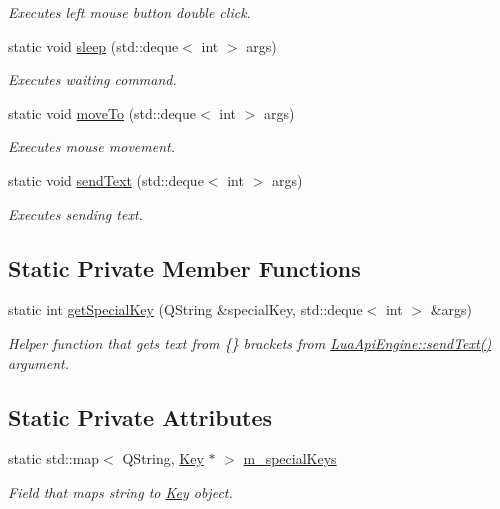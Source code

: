\begin{DoxyCompactItemize}
\begin{DoxyCompactList}\small\item\em Executes left mouse button double click. \end{DoxyCompactList}\item 
static void \hyperlink{class_lua_api_engine_a6910c482ffa6327999b49504522991b7}{sleep} (std\-::deque$<$ int $>$ args)
\begin{DoxyCompactList}\small\item\em Executes waiting command. \end{DoxyCompactList}\item 
static void \hyperlink{class_lua_api_engine_a8512ba309e37218b1586f8a41cae4451}{move\-To} (std\-::deque$<$ int $>$ args)
\begin{DoxyCompactList}\small\item\em Executes mouse movement. \end{DoxyCompactList}\item 
static void \hyperlink{class_lua_api_engine_a396ae61c3f7c771f5fe06584cef15169}{send\-Text} (std\-::deque$<$ int $>$ args)
\begin{DoxyCompactList}\small\item\em Executes sending text. \end{DoxyCompactList}\end{DoxyCompactItemize}
\subsection*{Static Private Member Functions}
\begin{DoxyCompactItemize}
\item 
static int \hyperlink{class_lua_api_engine_ac1b8a6a2ea07065dc1c3f7eed7937d8d}{get\-Special\-Key} (Q\-String \&special\-Key, std\-::deque$<$ int $>$ \&args)
\begin{DoxyCompactList}\small\item\em Helper function that gets text from \{\} brackets from \hyperlink{class_lua_api_engine_a396ae61c3f7c771f5fe06584cef15169}{Lua\-Api\-Engine\-::send\-Text()} argument. \end{DoxyCompactList}\end{DoxyCompactItemize}
\subsection*{Static Private Attributes}
\begin{DoxyCompactItemize}
\item 
static std\-::map$<$ Q\-String, \hyperlink{class_key}{Key} $\ast$ $>$ \hyperlink{class_lua_api_engine_a9fdba2d7f2f8d051453b5d1561435f5e}{m\-\_\-special\-Keys}
\begin{DoxyCompactList}\small\item\em Field that maps string to \hyperlink{class_key}{Key} object. \end{DoxyCompactList}\end{DoxyCompactItemize}


